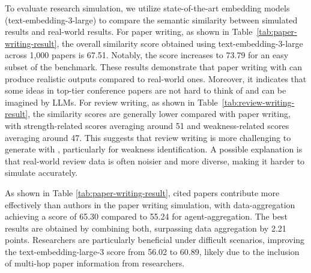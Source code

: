  To evaluate research simulation, we utilize state-of-the-art embedding models (text-embedding-3-large) to compare the semantic similarity between simulated results and real-world results. For paper writing, as shown in Table~\ref{tab:paper-writing-result}, the overall similarity score obtained using text-embedding-3-large across 1,000 papers is 67.51. Notably, the score increases to 73.79 for an easy subset of the benchmark. These results demonstrate that paper writing with \envname can produce realistic outputs compared to real-world ones. Moreover, it indicates that some ideas in top-tier conference papers are not hard to think of and can be imagined by LLMs. For review writing, as shown in Table~\ref{tab:review-writing-result}, the similarity scores are generally lower compared with paper writing, with strength-related scores averaging around 51 and weakness-related scores averaging around 47. This suggests that review writing is more challenging to generate with \envname, particularly for weakness identification. A possible explanation is that real-world review data is often noisier and more diverse, making it harder to simulate accurately.


 As shown in Table \ref{tab:paper-writing-result}, cited papers contribute more effectively than authors in the paper writing simulation, with data-aggregation achieving a score of 65.30 compared to 55.24 for agent-aggregation. The best results are obtained by combining both, surpassing data aggregation by 2.21 points. Researchers are particularly beneficial under difficult scenarios, improving the text-embedding-large-3 score from 56.02 to 60.89, likely due to the inclusion of multi-hop paper information from researchers.

